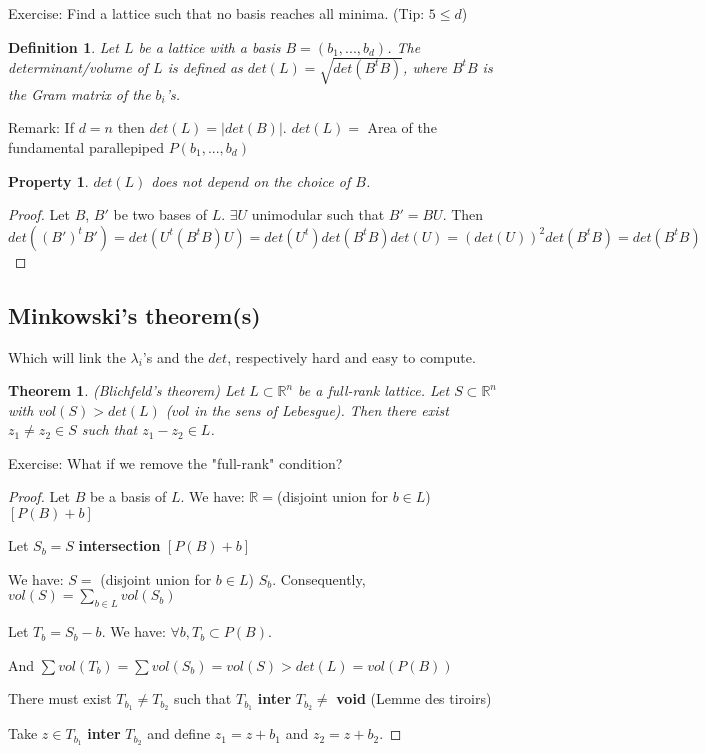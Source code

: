 \documentclass[a4paper,10pt]{article}
\newtheorem{definition}{Definition}
\newtheorem{theorem}{Theorem}
\newtheorem{proposition}{Property}
\begin{document}
Exercise: Find a lattice such that no basis reaches all minima. (Tip: $5 \leq d$)

\begin{definition}
Let $L$ be a lattice with a basis $B=(b_1,...,b_d)$. The determinant/volume of $L$ is defined as $det(L)=\sqrt{det(B^t B)}$, where $B^t B$ is the Gram matrix of the $b_i$'s. 
\end{definition}

Remark: If $d=n$ then $det(L)=|det(B)|$.
$det(L)=$ Area of the fundamental parallepiped $P(b_1,...,b_d)$

\begin{proposition}
$det(L)$ does not depend on the choice of $B$.
\end{proposition}

\begin{proof}
Let $B$, $B'$ be two bases of $L$. $\exists U$ unimodular such that $B'=B U$.
Then $det((B')^t B')=det(U^t (B^t B) U)=det(U^t) det(B^t B) det(U)=(det(U))^2 det(B^t B)=det(B^t B)$
\end{proof}

\subsection{Minkowski's theorem(s)}

Which will link the $\lambda_i$'s and the $det$, respectively hard and easy to compute.

\begin{theorem} (Blichfeld's theorem)
Let $L \subset \mathbb{R}^n$ be a full-rank lattice. Let $S \subset \mathbb{R}^n$ with $vol(S)>det(L)$ ($vol$ in the sens of Lebesgue). Then there exist $z_1 \neq z_2 \in S$ such that $z_1-z_2 \in L$.
\end{theorem}

Exercise: What if we remove the "full-rank" condition?

\begin{proof}
Let $B$ be a basis of $L$.
We have: $\mathbb{R}=$(disjoint union for $b \in L$)$[P(B)+b]$

Let $S_b=S$ \textbf{intersection} $[P(B)+b]$

We have: $S=$ (disjoint union for $b \in L$) $S_b$. Consequently, $vol(S)= \sum_{b \in L} vol(S_b)$

Let $T_b=S_b-b$. We have: $\forall b, T_b \subset P(B)$.

And $\sum vol(T_b)= \sum vol (S_b) = vol(S) > det(L) = vol(P(B))$

There must exist $T_{b_1} \neq T_{b_2}$ such that $T_{b_1}$ \textbf{inter} $T_{b_2} \neq$ \textbf{void} (Lemme des tiroirs)

Take $z \in T_{b_1}$ \textbf{inter} $T_{b_2}$ and define $z_1=z+b_1$ and $z_2=z+b_2$.
\end{proof}
\end{document}
